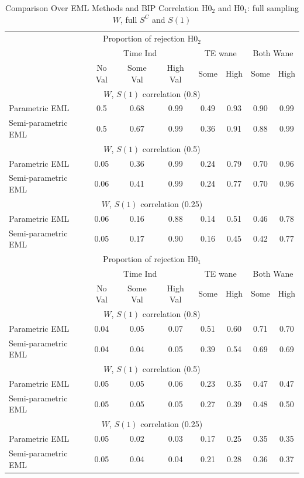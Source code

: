 \documentclass[times, 11pt]{article}
\begin{document}
\begin{table} [H]
\caption{Comparison Over EML Methods and BIP Correlation H0$_2$ and H0$_1$: full sampling $W$, full $S^{C}$ and $S(1)$ \label{compare_metods}}
\begin{tabular}{l|ccc|cc|cc}
\multicolumn{8}{c}{Proportion of rejection H0$_2$}\\
&\multicolumn{3}{c}{Time Ind}&\multicolumn{2}{c}{TE wane}&\multicolumn{2}{c}{Both Wane}\\
&No Val&Some Val&High Val&Some&High&Some&High\\
\hline
\multicolumn{8}{c}{$W$, $S(1)$ correlation (0.8)}\\
\hline
Parametric EML&0.5&0.68&0.99&0.49&0.93&0.90&0.99\\
Semi-parametric EML&0.5&0.67&0.99&0.36&0.91&0.88&0.99\\
\hline
\multicolumn{8}{c}{$W$, $S(1)$ correlation (0.5)}\\
\hline
Parametric EML&0.05 & 0.36 & 0.99 & 0.24 & 0.79 & 0.70 & 0.96 \\ 
Semi-parametric EML& 0.06 & 0.41 & 0.99 & 0.24 & 0.77 & 0.70 & 0.96 \\ 
\hline
\multicolumn{8}{c}{$W$, $S(1)$ correlation (0.25)}\\
\hline
Parametric EML& 0.06 & 0.16 & 0.88 & 0.14 & 0.51 & 0.46 & 0.78 \\ 
Semi-parametric EML& 0.05 & 0.17 & 0.90 & 0.16 & 0.45 & 0.42 & 0.77 \\
\hline
\hline
\multicolumn{8}{c}{Proportion of rejection H0$_1$}\\
&\multicolumn{3}{c}{Time Ind}&\multicolumn{2}{c}{TE wane}&\multicolumn{2}{c}{Both Wane}\\
&No Val&Some Val&High Val&Some&High&Some&High\\
\hline
\multicolumn{8}{c}{$W$, $S(1)$ correlation (0.8)}\\
\hline
Parametric EML&0.04&0.05&0.07&0.51&0.60&0.71&0.70\\
Semi-parametric EML&0.04&0.04&0.05&0.39&0.54&0.69&0.69\\
\hline
\multicolumn{8}{c}{$W$, $S(1)$ correlation (0.5)}\\
\hline
Parametric EML& 0.05 & 0.05 & 0.06 & 0.23 & 0.35 & 0.47 & 0.47 \\
Semi-parametric EML& 0.05 & 0.05 & 0.05 & 0.27 & 0.39 & 0.48 & 0.50 \\ 
\hline
\multicolumn{8}{c}{$W$, $S(1)$ correlation (0.25)}\\
\hline
Parametric EML& 0.05 & 0.02 & 0.03 & 0.17 & 0.25 & 0.35 & 0.35 \\ 
Semi-parametric EML& 0.05 & 0.04 & 0.04 & 0.21 & 0.28 & 0.36 & 0.37 \\ 
\hline
\end{tabular}
\end{table}
\end{document}
